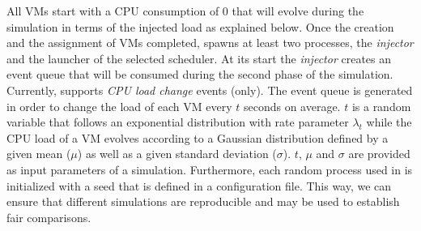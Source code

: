 %
All VMs start with a CPU consumption of 0 that will evolve during the
simulation in terms of the injected load as explained below.
%
Once the creation and the assignment of VMs completed, \vmps spawns at
least two \sg processes, the \emph{injector} and the launcher of the
selected scheduler.  At its start the \emph{injector}
creates an event queue that will be consumed during the second phase
of the simulation.  Currently, \vmps supports \emph{CPU
  load change} events (only).
%
The event queue is generated in order to change the load of each VM
every $t$ seconds on average. $t$ is a random variable that follows an
exponential distribution with rate parameter $\lambda_t$ while the CPU
load of a VM evolves according to a Gaussian distribution defined by a
given mean ($\mu$) as well as a given standard deviation
($\sigma$). $t$, $\mu$ and $\sigma$ are provided as input parameters
of a simulation.
Furthermore, each random process used in \vmps is initialized with a
seed that is defined in a configuration file. This way, we can ensure
that different simulations are reproducible and may be used to
establish fair comparisons.

